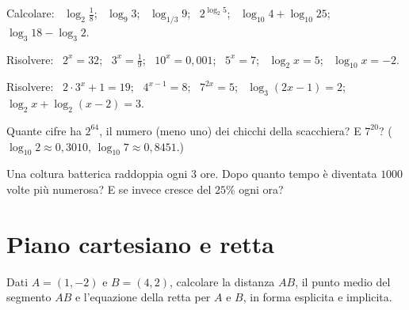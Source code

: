 \begin{esercizio}[\liv{1}]
Calcolare: \ $\log_2\frac18$; \ $\log_9 3$; \ $\log_{1/3}9$; \ $2^{\log_2 5}$; \ $\log_{10}4+\log_{10}25$; \ $\log_3 18-\log_3 2$.
\end{esercizio}

\begin{esercizio}[\liv{1}]
Risolvere: \ $2^x=32$; \ $3^x=\frac19$; \ $10^x=0{,}001$; \ $5^x=7$; \ $\log_2x=5$; \ $\log_{10}x=-2$.
\end{esercizio}

\begin{esercizio}[\liv{2}]
Risolvere: \ $2\cdot3^x+1=19$; \ $4^{x-1}=8$; \ $7^{2x}=5$; \ $\log_3(2x-1)=2$; \ $\log_2x+\log_2(x-2)=3$.
\end{esercizio}

\begin{esercizio}[\liv{2}]
Quante cifre ha $2^{64}$, il numero (meno uno) dei chicchi della scacchiera? E $7^{20}$? ($\log_{10}2\approx0{,}3010$, $\log_{10}7\approx0{,}8451$.)
\end{esercizio}

\begin{esercizio}[\liv{3}]
Una coltura batterica raddoppia ogni $3$ ore. Dopo quanto tempo è diventata $1000$ volte più numerosa? E se invece cresce del $25\%$ ogni ora?
\end{esercizio}

\section{Piano cartesiano e retta}

\begin{esercizio}[\liv{1}]
Dati $A=(1,-2)$ e $B=(4,2)$, calcolare la distanza $AB$, il punto medio del segmento $AB$ e l'equazione della retta per $A$ e $B$, in forma esplicita e implicita.
\end{esercizio}

